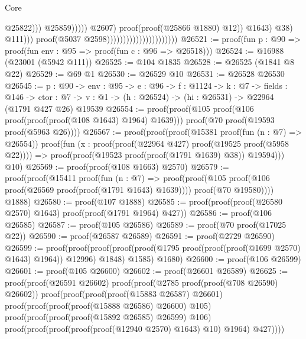 \begin{lexlean}{Core}
\begin{coremodule}
                                                                                          @25822)))
                                                                                  @25859)))))
                                                                      @2607)
                                                                    proof(proof(@25866 @1880) @12))
                                                                  @1643)
                                                                @38)
                                                              @111)))
                                                      proof(@5037 @2598))))))))))))))))))))))
@26521 := proof(fun {p : @90} => proof(fun {env : @95} => proof(fun {c : @96} => @26518)))
@26524 := @16988 (@23001 (@5942 @111))
@26525 := @104 @1835
@26528 := @26525 (@1841 @8 @22)
@26529 := @69 @1
@26530 := @26529 @10
@26531 := @26528 @26530
@26545 := {p : @90} ->
  {env : @95} ->
  {e : @96} ->
  {f : @1124} ->
  {k : @7} ->
  {fields : @146} ->
  {ctor : @7} -> {v : @1} -> (h : @26524) -> (hi : @26531) -> @22964 (@1791 @427 @26) @19539
@26554 := proof(proof(@105 proof(@106 proof(proof(proof(@108 @1643) @1964) @1639)))
      proof(@70 proof(@19593 proof(@5963 @26))))
@26567 := proof(proof(proof(@15381 proof(fun (n : @7) => @26554))
        proof(fun (x : proof(proof(@22964 @427) proof(@19525 proof(@5958 @22)))) =>
          proof(proof(@19523 proof(proof(@1791 @1639) @38)) @19594)))
      @10)
@26569 := proof(proof(@108 @1663) @2570)
@26579 := proof(proof(@15411
        proof(fun (n : @7) =>
          proof(proof(@105 proof(@106 proof(@26569 proof(proof(@1791 @1643) @1639))))
              proof(@70 @19580))))
      @1888)
@26580 := proof(@107 @1888)
@26585 := proof(proof(proof(@26580 @2570) @1643) proof(proof(@1791 @1964) @427))
@26586 := proof(@106 @26585)
@26587 := proof(@105 @26586)
@26589 := proof(@70 proof(@17025 @22))
@26590 := proof(@26587 @26589)
@26591 := proof(@2729 @26590)
@26599 := proof(proof(proof(proof(proof(@1795 proof(proof(proof(@1699 @2570) @1643) @1964)) @12996)
          @1848)
        @1585)
      @1680)
@26600 := proof(@106 @26599)
@26601 := proof(@105 @26600)
@26602 := proof(@26601 @26589)
@26625 := proof(proof(@26591 @26602)
      proof(proof(@2785 proof(proof(@708 @26590) @26602))
          proof(proof(proof(proof(@15883 @26587) @26601)
                proof(proof(proof(proof(@15888 @26586) @26600) @105)
                    proof(proof(proof(proof(@15892 @26585) @26599) @106)
                        proof(proof(proof(proof(proof(@12940 @2570) @1643) @10) @1964) @427))))

\end{coremodule}
\end{lexlean}
